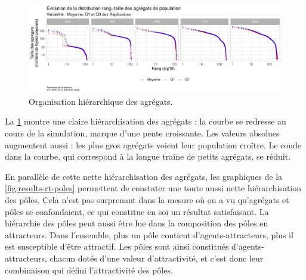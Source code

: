 \begin{figure}[H]
	\centering
	\includegraphics[width=\linewidth]{img/results_6_6/Agregats_RT_Haut.pdf}
	\caption[Hiérarchie des agrégats]{Organisation hiérarchique des agrégats.}
	\label{fig:results-rt-agregats}
\end{figure}

La \cref{fig:results-rt-agregats} montre une claire hiérarchisation des agrégats : la courbe se \og redresse\fg{} au cours de la simulation, marque d'une pente croissante.
Les valeurs absolues augmentent aussi : les plus gros agrégats voient leur population croître.
Le \og coude\fg{} dans la courbe, qui correspond à la longue traîne de petits agrégats, se réduit.

En parallèle de cette nette hiérarchisation des agrégats, les graphiques de la  \cref{fig:results-rt-poles} permettent de constater une toute aussi nette hiérarchisation des pôles.
Cela n'est pas surprenant dans la mesure où on a vu qu'agrégats et pôles se confondaient, ce qui constitue en soi un résultat satisfaisant.
La hiérarchie des pôles peut aussi être lue dans la composition des pôles en attracteurs.
Dans l'ensemble, plus un pôle contient d'agents-attracteurs, plus il est susceptible d'être attractif.
Les pôles sont ainsi constitués d'agents-attracteurs, chacun dotés d'une valeur d'attractivité, et c'est donc leur combinaison qui défini l'attractivité des pôles.


